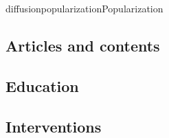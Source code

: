 \documentclass{ra2018}
\begin{document}
\begin{module}{diffusion}{popularization}{Popularization}
\subsection{Articles and contents}

\subsection{Education}


\subsection{Interventions}
      


\end{module}
\end{document}
